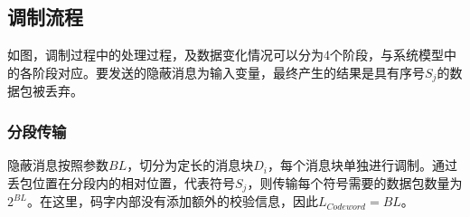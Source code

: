 \subsection{调制流程}
\label{chap:zigzag:model:modulation}


如图，调制过程中的处理过程，及数据变化情况可以分为4个阶段，与系统模型中的各阶段对应。要发送的隐蔽消息为输入变量，最终产生的结果是具有序号$S_{j}$的数据包被丢弃。

\subsubsection{分段传输}
\label{chap:zigzag:model:modulation:segment}
隐蔽消息按照参数$BL$，切分为定长的消息块$D_{i}$，每个消息块单独进行调制。通过丢包位置在分段内的相对位置，代表符号$S_{j}$，则传输每个符号需要的数据包数量为$2^{BL}$。在这里，码字内部没有添加额外的校验信息，因此$L_{Codeword}=BL$。


